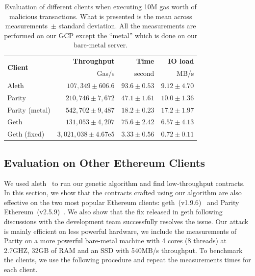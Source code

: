   \begin{table}
    \centering
    \setlength{\tabcolsep}{3pt}
    \caption[Evaluation of different Ethereum clients]{Evaluation of different clients when executing 10M gas worth of malicious transactions. What is presented is the mean across  measurements~$\pm$ standard deviation. All the measurements are performed on our GCP except the ``metal'' which is done on our bare-metal server.}
    \label{tab:clients-evaluation}
    \begin{tabular}{l r r r}
      \toprule
      \multirow{2}{*}{\textbf{Client}} & \textbf{Throughput}             & \textbf{Time}   & \textbf{IO load} \\
                                       & Gas/s                           & second          & MB/s             \\
      \midrule
      Aleth                            & $107,349\pm 606.6$              & $93.6\pm 0.53$  & $9.12\pm 4.70$   \\
      Parity                           & $210,746\pm 7,672$              & $47.1\pm 1.61$  & $10.0\pm 1.36$   \\
      Parity (\small{metal})           & $542,702\pm 9,487$              & $18.2\pm 0.23$  & $17.2\pm 1.97$   \\
      Geth                             & $131,053\pm 4,207$              & $75.6\pm 2.42$  & $6.57\pm 4.13$   \\
      Geth (\small{fixed})             & $3,021,038 \pm 4.67\mathrm{e}5$ & $3.33 \pm 0.56$ & $0.72\pm 0.11$   \\
      \bottomrule
    \end{tabular}
  \end{table}

  \subsection{Evaluation on Other Ethereum Clients}
  We used aleth~\cite{aleth} to run our genetic algorithm and find low-throughput contracts. In this section, we show that the contracts crafted using our algorithm are also effective on the two most popular Ethereum clients: geth~(v1.9.6)~\cite{geth} and Parity Ethereum~(v2.5.9)~\cite{parity-ethereum}. We also show that the fix released in geth following discussions with the development team successfully resolves the issue. Our attack is mainly efficient on less powerful hardware, we include the measurements of Parity on a more powerful bare-metal machine with 4 cores (8 threads) at 2.7GHZ, 32GB of RAM and an SSD with 540MB/s throughput.
  To benchmark the clients, we use the following procedure and repeat the measurements  times for each client.

